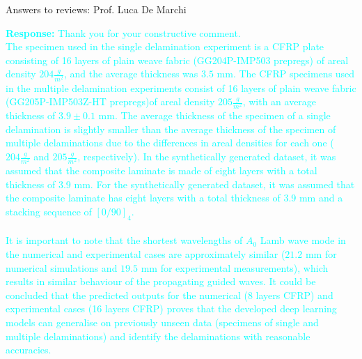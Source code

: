 \documentclass[10pt,aspectratio=169,dvipsnames]{beamer} %
\begin{document}
\begin{frame}{Answers to reviews: Prof. Luca De Marchi}
\begin{itemize}
{			\textcolor{Cyan}{
				\textbf{Response:}
				Thank you for your constructive comment. \\
				The specimen used in the single delamination experiment is a CFRP plate consisting of 16 layers of plain weave fabric (GG204P-IMP503 prepregs) of areal density \(204\frac{g}{m^2}\), and the average thickness was \(3.5\) mm.
				The CFRP specimens used in the multiple delamination experiments consist of 16 layers of plain weave fabric (GG205P-IMP503Z-HT prepregs)of areal density \(205\frac{g}{m^2}\), with an average thickness of \(3.9 \pm 0.1\) mm. 
				The average thickness of the specimen of a single delamination is slightly smaller than the average thickness of the specimen of multiple delaminations due to the differences in areal densities for each one (\(204\frac{g}{m^2}\) and \(205\frac{g}{m^2}\), respectively).
				In the synthetically generated dataset, it was assumed that the composite laminate is made of eight layers with a total thickness of 3.9 mm.
				For the synthetically generated dataset, it was assumed that the composite laminate has eight layers with a total thickness of 3.9 mm and a stacking sequence of \([0/90]_4\).		
				\\ \\	
				It is important to note that the shortest wavelengths of \(A_0\) Lamb wave mode in the numerical and experimental cases are approximately similar (\(21.2\) mm for numerical simulations and \(19.5\) mm for experimental measurements), which results in similar behaviour of the propagating guided waves.
				It could be concluded that the predicted outputs for the numerical (8 layers CFRP) and experimental cases (16 layers CFRP) proves that the developed deep learning models can generalise on previously unseen data (specimens of single and multiple delaminations) and identify the delaminations with reasonable accuracies.
			}}	
			
\end{itemize}
\end{frame}
\end{document}
